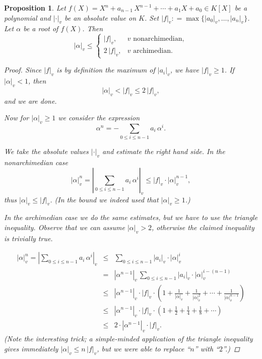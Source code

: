 \documentclass{article}
\newtheorem{proposition}{Proposition}[section]
\theoremstyle{definition}
\newcommand{\dfn}{\mathrel{\mathop:}=}
\begin{document}
\begin{proposition}
  Let $f (X) = X^n + a_{n-1}\,X^{n-1} + \cdots + a_1 X + a_0 \in K [X]$ be a
  polynomial and $|\cdot|_v$ be an absolute value on $K$. Set
  $|f|_v \dfn \max \{ |a_0|_v, \ldots, |a_n|_v \}$. Let $\alpha$ be a root of
  $f (X)$. Then
  \[ |\alpha|_v \le
    \left\{\begin{array}{rl}
             |f|_v, & v \text{ nonarchimedian},\\
             2 \, |f|_v, & v \text{ archimedian}.
           \end{array}\right.\]

  \begin{proof}
    Since $|f|_v$ is by definition the maximum of $|a_i|_v$, we have
    $|f|_v \ge 1$. If $|\alpha|_v < 1$, then
    $$|\alpha|_v < |f|_v \le 2\,|f|_v,$$
    and we are done.

    \vspace{1em}

    Now for $|\alpha|_v \ge 1$ we consider the expression
    \[ \alpha^n = - \sum_{0 \le i \le n-1} a_i\,\alpha^i. \]

    We take the absolute values $|\cdot|_v$ and estimate the right hand side. In
    the nonarchimedian case
    \[ |\alpha|^n_v = \left|\sum_{0 \le i \le n-1} a_i \, \alpha^i\right|_v \le |f|_v \cdot |\alpha|^{n-1}_v, \]
    thus $|\alpha|_v \le |f|_v$. (In the bound we indeed used that $|\alpha|_v \ge 1$.)

    \vspace{1em}

    In the archimedian case we do the same estimates, but we have to use the
    triangle inequality. Observe that we can assume $|\alpha|_v > 2$, otherwise
    the claimed inequality is trivially true.

    \begin{eqnarray*}
      |\alpha|^n_v = \left|\sum_{0 \le i \le n-1} a_i \, \alpha^i\right|_v & \le & \sum_{0 \le i \le n-1} |a_i|_v \cdot |\alpha|^i_v\\
      & = & |\alpha^{n-1}|_v \, \sum_{0 \le i \le n-1} |a_i|_v \cdot |\alpha|^{i-(n-1)}_v \\
      & \le & |\alpha^{n-1}|_v \cdot |f|_v \cdot \left(1 + \frac{1}{|\alpha|_v} + \frac{1}{|\alpha|^2_v} + \cdots + \frac{1}{|\alpha|^{n-1}_v}\right) \\
      & \le & |\alpha^{n-1}|_v \cdot |f|_v \cdot \left(1 + \frac{1}{2} + \frac{1}{4} + \frac{1}{8} + \cdots\right) \\
      & \le & 2 \cdot |\alpha^{n-1}|_v \cdot |f|_v.
    \end{eqnarray*}
    (Note the interesting trick; a simple-minded application of the
    triangle inequality gives immediately $|\alpha|_v \le n \, |f|_v$, but we
    were able to replace ``$n$'' with ``$2$''.)
  \end{proof}
\end{proposition}
\end{document}
